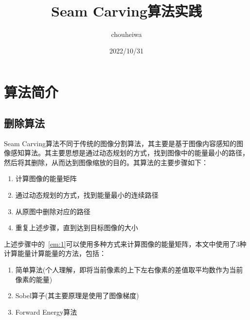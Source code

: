 \documentclass[UTF8]{article} %
\title{Seam Carving算法实践}
\author{chouheiwa}
\date{2022/10/31}
\begin{document}
    \maketitle
    \tableofcontents

    \section{算法简介}
    \subsection{删除算法}
    Seam Carving算法不同于传统的图像分割算法，其主要是基于图像内容感知的图像感知算法。其主要思想是通过动态规划的方式，找到图像中的能量最小的路径，然后将其删除，从而达到图像缩放的目的。其算法的主要步骤如下：
    \begin{enumerate}
        \item 计算图像的能量矩阵 \label{em:1}
        \item 通过动态规划的方式，找到能量最小的连续路径 \label{em:2}
        \item 从原图中删除对应的路径
        \item 重复上述步骤，直到达到目标图像的大小
    \end{enumerate}

    上述步骤中的~\ref{em:1}可以使用多种方式来计算图像的能量矩阵，本文中使用了3种计算能量计算能量的方法，包括：
    \begin{enumerate}
        \item 简单算法(个人理解，即将当前像素的上下左右像素的差值取平均数作为当前像素的能量)
        \item Sobel算子(其主要原理是使用了图像梯度)
        \item Forward Energy算法~\cite{rubinstein2008improved}
    \end{enumerate}




    
    
\end{document}
